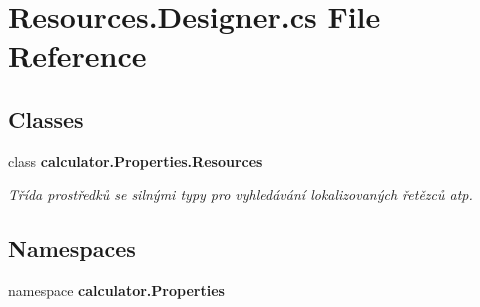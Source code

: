 \section{Resources.\+Designer.\+cs File Reference}
\label{_resources_8_designer_8cs}
\subsection*{Classes}
\begin{DoxyCompactItemize}
\item 
class {\bfseries calculator.\+Properties.\+Resources}
\begin{DoxyCompactList}\small\item\em Třída prostředků se silnými typy pro vyhledávání lokalizovaných řetězců atp. \end{DoxyCompactList}\end{DoxyCompactItemize}
\subsection*{Namespaces}
\begin{DoxyCompactItemize}
\item 
namespace \textbf{ calculator.\+Properties}
\end{DoxyCompactItemize}
